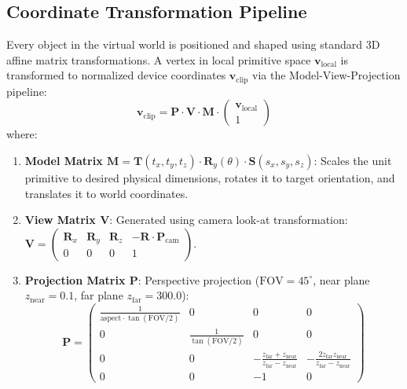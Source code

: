 \documentclass[11pt,a4paper]{article}
\begin{document}
\subsection{Coordinate Transformation Pipeline}
Every object in the virtual world is positioned and shaped using standard 3D affine matrix transformations. A vertex in local primitive space $\mathbf{v}_{\text{local}}$ is transformed to normalized device coordinates $\mathbf{v}_{\text{clip}}$ via the Model-View-Projection pipeline:
\begin{equation}
    \mathbf{v}_{\text{clip}} = \mathbf{P} \cdot \mathbf{V} \cdot \mathbf{M} \cdot \begin{pmatrix} \mathbf{v}_{\text{local}} \\ 1 \end{pmatrix}
\end{equation}
where:
\begin{enumerate}[leftmargin=1.2em, itemsep=1.0pt, topsep=1.0pt]
    \item \textbf{Model Matrix $\mathbf{M} = \mathbf{T}(t_x, t_y, t_z) \cdot \mathbf{R}_y(\theta) \cdot \mathbf{S}(s_x, s_y, s_z)$}: Scales the unit primitive to desired physical dimensions, rotates it to target orientation, and translates it to world coordinates.
    \item \textbf{View Matrix $\mathbf{V}$}: Generated using camera look-at transformation:
    $\mathbf{V} = \begin{pmatrix} \mathbf{R}_x & \mathbf{R}_y & \mathbf{R}_z & -\mathbf{R} \cdot \mathbf{P}_{\text{cam}} \\ 0 & 0 & 0 & 1 \end{pmatrix}$.
    \item \textbf{Projection Matrix $\mathbf{P}$}: Perspective projection ($\text{FOV} = 45^\circ$, near plane $z_{\text{near}} = 0.1$, far plane $z_{\text{far}} = 300.0$):
    \begin{equation}
        \mathbf{P} = \begin{pmatrix} 
        \frac{1}{\text{aspect} \cdot \tan(\text{FOV}/2)} & 0 & 0 & 0 \\
        0 & \frac{1}{\tan(\text{FOV}/2)} & 0 & 0 \\
        0 & 0 & -\frac{z_{\text{far}} + z_{\text{near}}}{z_{\text{far}} - z_{\text{near}}} & -\frac{2 z_{\text{far}} z_{\text{near}}}{z_{\text{far}} - z_{\text{near}}} \\
        0 & 0 & -1 & 0
        \end{pmatrix}
    \end{equation}
\end{enumerate}
\end{document}
